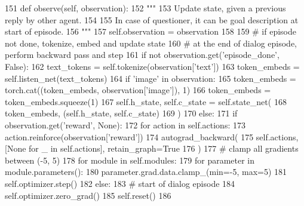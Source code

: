 \begin{DoxyCode}
151     \textcolor{keyword}{def }observe(self, observation):
152         \textcolor{stringliteral}{"""}
153 \textcolor{stringliteral}{        Update state, given a previous reply by other agent.}
154 \textcolor{stringliteral}{}
155 \textcolor{stringliteral}{        In case of questioner, it can be goal description at start of episode.}
156 \textcolor{stringliteral}{        """}
157         self.observation = observation
158 
159         \textcolor{comment}{# if episode not done, tokenize, embed and update state}
160         \textcolor{comment}{# at the end of dialog episode, perform backward pass and step}
161         \textcolor{keywordflow}{if} \textcolor{keywordflow}{not} observation.get(\textcolor{stringliteral}{'episode\_done'}, \textcolor{keyword}{False}):
162             text\_tokens = self.tokenize(observation[\textcolor{stringliteral}{'text'}])
163             token\_embeds = self.listen\_net(text\_tokens)
164             \textcolor{keywordflow}{if} \textcolor{stringliteral}{'image'} \textcolor{keywordflow}{in} observation:
165                 token\_embeds = torch.cat((token\_embeds, observation[\textcolor{stringliteral}{'image'}]), 1)
166                 token\_embeds = token\_embeds.squeeze(1)
167             self.h\_state, self.c\_state = self.state\_net(
168                 token\_embeds, (self.h\_state, self.c\_state)
169             )
170         \textcolor{keywordflow}{else}:
171             \textcolor{keywordflow}{if} observation.get(\textcolor{stringliteral}{'reward'}, \textcolor{keywordtype}{None}):
172                 \textcolor{keywordflow}{for} action \textcolor{keywordflow}{in} self.actions:
173                     action.reinforce(observation[\textcolor{stringliteral}{'reward'}])
174                 autograd\_backward(
175                     self.actions, [\textcolor{keywordtype}{None} \textcolor{keywordflow}{for} \_ \textcolor{keywordflow}{in} self.actions], retain\_graph=\textcolor{keyword}{True}
176                 )
177                 \textcolor{comment}{# clamp all gradients between (-5, 5)}
178                 \textcolor{keywordflow}{for} module \textcolor{keywordflow}{in} self.modules:
179                     \textcolor{keywordflow}{for} parameter \textcolor{keywordflow}{in} module.parameters():
180                         parameter.grad.data.clamp\_(min=-5, max=5)
181                 self.optimizer.step()
182             \textcolor{keywordflow}{else}:
183                 \textcolor{comment}{# start of dialog episode}
184                 self.optimizer.zero\_grad()
185                 self.reset()
186 
\end{DoxyCode}
\mbox{\label{classprojects_1_1taskntalk_1_1coopgame__agent_1_1CooperativeGameAgent_aa5fe586f3c20c7db8eea6ffae87b0a34}} 
